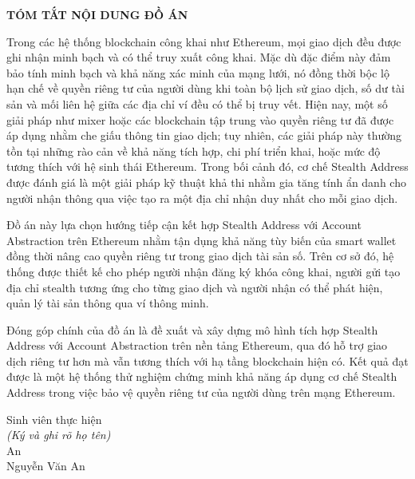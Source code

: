 \begin{center}
    \Large{\textbf{TÓM TẮT NỘI DUNG ĐỒ ÁN}}\\
\end{center}
\vspace{1cm}

Trong các hệ thống blockchain công khai như Ethereum, mọi giao dịch đều được ghi nhận minh bạch và có thể truy xuất công khai. Mặc dù đặc điểm này đảm bảo tính minh bạch và khả năng xác minh của mạng lưới, nó đồng thời bộc lộ hạn chế về quyền riêng tư của người dùng khi toàn bộ lịch sử giao dịch, số dư tài sản và mối liên hệ giữa các địa chỉ ví đều có thể bị truy vết. Hiện nay, một số giải pháp như mixer hoặc các blockchain tập trung vào quyền riêng tư đã được áp dụng nhằm che giấu thông tin giao dịch; tuy nhiên, các giải pháp này thường tồn tại những rào cản về khả năng tích hợp, chi phí triển khai, hoặc mức độ tương thích với hệ sinh thái Ethereum. Trong bối cảnh đó, cơ chế Stealth Address được đánh giá là một giải pháp kỹ thuật khả thi nhằm gia tăng tính ẩn danh cho người nhận thông qua việc tạo ra một địa chỉ nhận duy nhất cho mỗi giao dịch.

Đồ án này lựa chọn hướng tiếp cận kết hợp Stealth Address với Account Abstraction trên Ethereum nhằm tận dụng khả năng tùy biến của smart wallet đồng thời nâng cao quyền riêng tư trong giao dịch tài sản số. Trên cơ sở đó, hệ thống được thiết kế cho phép người nhận đăng ký khóa công khai, người gửi tạo địa chỉ stealth tương ứng cho từng giao dịch và người nhận có thể phát hiện, quản lý tài sản thông qua ví thông minh.

Đóng góp chính của đồ án là đề xuất và xây dựng mô hình tích hợp Stealth Address với Account Abstraction trên nền tảng Ethereum, qua đó hỗ trợ giao dịch riêng tư hơn mà vẫn tương thích với hạ tầng blockchain hiện có. Kết quả đạt được là một hệ thống thử nghiệm chứng minh khả năng áp dụng cơ chế Stealth Address trong việc bảo vệ quyền riêng tư của người dùng trên mạng Ethereum.

\begin{flushright}
Sinh viên thực hiện\\[1cm]
\textit{(Ký và ghi rõ họ tên)}\\[2cm]

An\\
Nguyễn Văn An
\end{flushright}